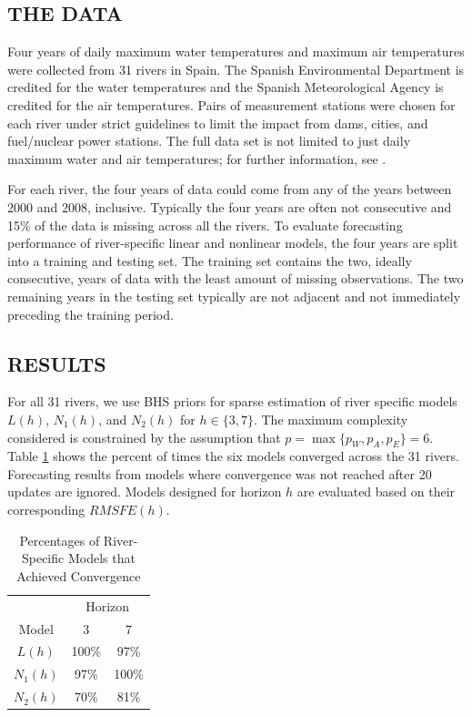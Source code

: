  
 
 
 \vskip 3mm
 
 \subsection{THE DATA} 
 
Four years of daily maximum water temperatures and maximum air temperatures were collected from 31 rivers in Spain. The Spanish Environmental Department is credited for the water temperatures and the Spanish Meteorological Agency is credited for the air temperatures. Pairs of measurement stations were chosen for each river under strict guidelines to limit the impact from dams, cities, and fuel/nuclear power stations. The full data set is not limited to just daily maximum water and air temperatures; for further information, see \cite{Kamarianakis2016}.
 
For each river, the four years of data could come from any of the years between 2000 and 2008, inclusive. Typically the four years are often not consecutive and 15\% of the data is missing across all the rivers. To evaluate forecasting performance of river-specific linear and nonlinear models, the four years are split into a training and testing set. The training set contains the two, ideally consecutive, years of data with the least amount of missing observations. The two remaining years in the testing set typically are not adjacent and not immediately preceding the training period. 

\vskip 3mm

\subsection{RESULTS}

For all 31 rivers, we use BHS priors for sparse estimation of river specific models $L(h)$, $N_1(h)$, and $N_2(h)$ for $h \in \{3,7\}$. The maximum complexity considered is constrained by the assumption that $p=\max \{p_W, p_A, p_E\}=6$. Table \ref{tab:convriv} shows the percent of times the six models converged across the 31 rivers. Forecasting results from models where convergence was not reached after 20 updates are ignored. Models designed for horizon $h$ are evaluated based on their corresponding $RMSFE(h)$.

\begin{table}[!h]
	\footnotesize
  \centering
  \caption{ Percentages of River-Specific Models that Achieved Convergence }
    \begin{tabular}{ccc}
    \toprule
    &  \multicolumn{2}{c}{Horizon}  \\
    Model & 3 & 7\\
    \midrule
    $L(h)$ &  100\% & 97\%\\
    $N_1(h)$ & 97\% & 100\%\\
    $N_2(h)$ & 70\% & 81\%\\
    \bottomrule
    \end{tabular}%
  \label{tab:convriv}%
\end{table}%

